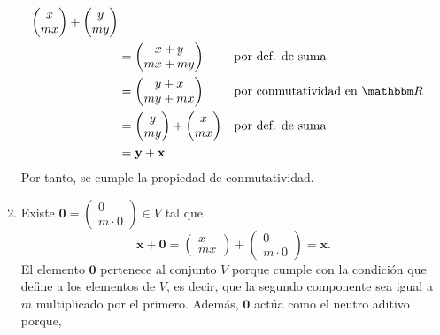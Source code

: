 \begin{examplebox}{}{}
\begin{enumerate}[label=\roman*), topsep=6pt, itemsep=0pt]
\begin{align*}
\begin{pmatrix}
                x \\
                mx
            \end{pmatrix} + \begin{pmatrix}
                y \\
                my
            \end{pmatrix} \\
            & = \begin{pmatrix}
                x + y \\
                mx + my
            \end{pmatrix} && \text{por def. de suma} \\
            & = \begin{pmatrix}
                y + x \\
                my + mx
            \end{pmatrix} && \text{por conmutatividad en $\RR$} \\
            & = \begin{pmatrix}
                y \\
                my
            \end{pmatrix} + \begin{pmatrix}
                x \\
                mx
            \end{pmatrix} && \text{por def. de suma} \\
            & = \mathbf{y} + \mathbf{x}
        \end{align*}
        Por tanto, se cumple la propiedad de conmutatividad.
        \item Existe $\mathbf{0} = \begin{pmatrix}
            0 \\
            m \cdot 0
        \end{pmatrix} \in V$ tal que
        $$\mathbf{x} + \mathbf{0} = \begin{pmatrix}
            x \\
            mx
        \end{pmatrix} + \begin{pmatrix}
            0 \\
            m \cdot 0
        \end{pmatrix} = \mathbf{x}.$$
        El elemento $\mathbf{0}$ pertenece al conjunto $V$ porque cumple con la condición que define a los elementos de $V$, es decir, que la segundo componente sea igual a $m$ multiplicado por el primero. Además, $\mathbf{0}$ actúa como el neutro aditivo porque,

\end{enumerate}
\end{examplebox}

